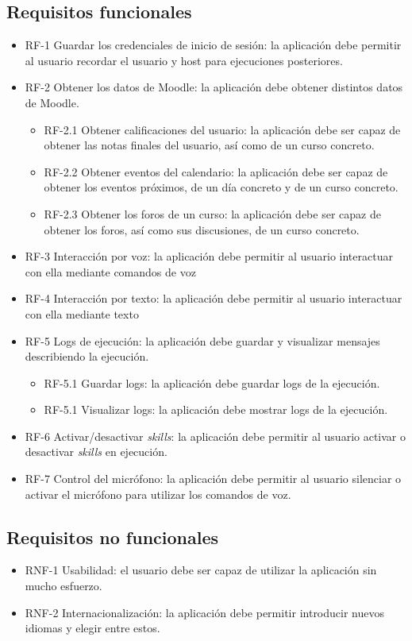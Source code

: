 \subsection{Requisitos funcionales}
\begin{itemize}
	\item RF-1 Guardar los credenciales de inicio de sesión: la aplicación debe permitir al usuario recordar el usuario y host para ejecuciones posteriores.
	\item RF-2 Obtener los datos de Moodle: la aplicación debe obtener distintos datos de Moodle.
	\begin{itemize}
		\item RF-2.1 Obtener calificaciones del usuario: la aplicación debe ser capaz de obtener las notas finales del usuario, así como de un curso concreto.
		\item RF-2.2 Obtener eventos del calendario: la aplicación debe ser capaz de obtener los eventos próximos, de un día concreto y de un curso concreto.
		\item RF-2.3 Obtener los foros de un curso: la aplicación debe ser capaz de obtener los foros, así como sus discusiones, de un curso concreto.
	\end{itemize}
	\item RF-3 Interacción por voz: la aplicación debe permitir al usuario interactuar con ella mediante comandos de voz
	\item RF-4 Interacción por texto: la aplicación debe permitir al usuario interactuar con ella mediante texto
	\item RF-5 Logs de ejecución: la aplicación debe guardar y visualizar mensajes describiendo la ejecución.
	\begin{itemize}
		\item RF-5.1 Guardar logs: la aplicación debe guardar logs de la ejecución.
		\item RF-5.1 Visualizar logs: la aplicación debe mostrar logs de la ejecución.
	\end{itemize}
	\item RF-6 Activar/desactivar \textit{skills}: la aplicación debe permitir al usuario activar o desactivar \textit{skills} en ejecución.
	\item RF-7 Control del micrófono: la aplicación debe permitir al usuario silenciar o activar el micrófono para utilizar los comandos de voz.
\end{itemize}

\subsection{Requisitos no funcionales}
\begin{itemize}
	\item RNF-1 Usabilidad: el usuario debe ser capaz de utilizar la aplicación sin mucho esfuerzo.
	\item RNF-2 Internacionalización: la aplicación debe permitir introducir nuevos idiomas y elegir entre estos.
\end{itemize}

